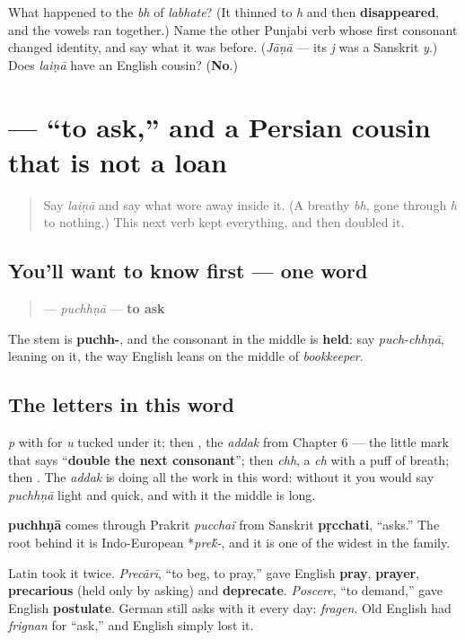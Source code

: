 \begin{tcolorbox}[breakable,colback=teal!4,colframe=teal!35!black,title={Before you move on}]
What happened to the \emph{bh} of \emph{labhate}? (It thinned to \emph{h} and then \textbf{disappeared}, and the vowels ran together.) Name the other Punjabi verb whose first consonant changed identity, and say what it was before. (\emph{Jāṇā} — its \emph{j} was a Sanskrit \emph{y}.) Does \emph{laiṇā} have an English cousin? (\textbf{No}.)
\end{tcolorbox}
\section[\texorpdfstring{\pa{ਪੁੱਛਣਾ} (puchhṇā)}{ਪੁੱਛਣਾ (puchhṇā)}]{ — “to ask,” and a Persian cousin that is not a loan}

\label{lesson:PA-C09-puchhna}



\begin{quote}
Say \emph{laiṇā} and say what wore away inside it. (A breathy \emph{bh}, gone through \emph{h} to nothing.) This next verb kept everything, and then doubled it.
\end{quote}

\subsection*{You'll want to know first — one word}
\begin{quote}
\textbf{} — \emph{puchhṇā} — \textbf{to ask}
\end{quote}

The stem is \textbf{puchh-}, and the consonant in the middle is \textbf{held}: say \emph{puch-chhṇā}, leaning on it, the way English leans on the middle of \emph{bookkeeper}.

\subsection*{The letters in this word}
\textbf{} \emph{p} with \textbf{} for \emph{u} tucked under it; then \textbf{}, the \emph{addak} from Chapter 6 — the little mark that says “\textbf{double the next consonant}”; then \textbf{} \emph{chh}, a \emph{ch} with a puff of breath; then \textbf{}. The \emph{addak} is doing all the work in this word: without it you would say \emph{puchhṇā} light and quick, and with it the middle is long.

\begin{cousinweb}
\textbf{puchhṇā} comes through Prakrit \emph{pucchaï} from Sanskrit \textbf{pṛcchati}, “asks.” The root behind it is Indo-European *\emph{pre\'{k}-}, and it is one of the widest in the family.

Latin took it twice. \emph{Precārī}, “to beg, to pray,” gave English \textbf{pray}, \textbf{prayer}, \textbf{precarious} (held only by asking) and \textbf{deprecate}. \emph{Poscere}, “to demand,” gave English \textbf{postulate}. German still asks with it every day: \emph{fragen}. Old English had \emph{frignan} for “ask,” and English simply lost it.
\end{cousinweb}


